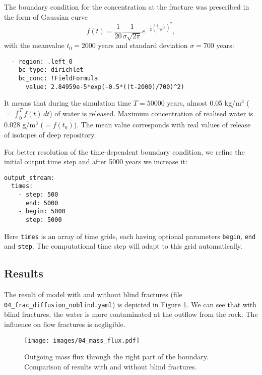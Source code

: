 The boundary condition for the concentration at the fracture was
prescribed in the form of Gaussian curve
\[ f(t) = \frac1{20} \frac{1}{\sigma\sqrt{2\pi}}e^{-\frac12\left(\frac{t-t_0}{\sigma}\right)^2}, \]
with the meanvalue \(t_0=2000\) years and standard deviation
\(\sigma=700\) years:

\begin{verbatim}
  - region: .left_0
    bc_type: dirichlet
    bc_conc: !FieldFormula
      value: 2.84959e-5*exp(-0.5*((t-2000)/700)^2)
\end{verbatim}

It means that during the simulation time \(T=50000\) years, almost 0.05
kg/m\(^3\) (\(=\int_0^Tf(t)\,dt\)) of water is released. Maximum
concentration of realised water is 0.028 g/m\(^3\) (\(=f(t_0)\)). The
mean value corresponds with real values of release of isotopes of deep
repository.

For better resolution of the time-dependent boundary condition, we
refine the initial output time step and after 5000 years we increase it:

\begin{verbatim}
output_stream:
  times:
    - step: 500
      end: 5000
    - begin: 5000
      step: 5000
\end{verbatim}

Here \texttt{times} is an array of time grids, each having optional
parameters \texttt{begin}, \texttt{end} and \texttt{step}. The
computational time step will adapt to this grid automatically.

\subsection{Results}\label{results}

The result of model with and without blind fractures (file
\texttt{04\_frac\_diffusion\_noblind.yaml}) is depicted in Figure
\ref{fig:diff_res}. We can see that with blind fractures, the water is
more contaminated at the outflow from the rock. The influence on flow
fractures is negligible.

\begin{figure}[htbp]
\centering
\texttt{[image: images/04\_mass\_flux.pdf]}
\caption{Outgoing mass flux through the right part of the boundary.
Comparison of results with and without blind
fractures.\label{fig:diff_res}}
\end{figure}
